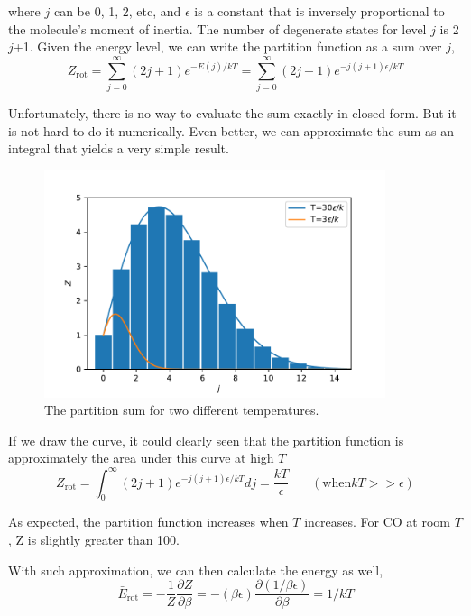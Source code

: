 where $j$ can be 0, 1, 2, etc, and $\epsilon$ is a constant that is inversely proportional to the molecule's moment of inertia.
The number of degenerate states for level $j$ is 2$j$+1. Given the energy level, we can write the partition function as a sum over $j$,
\begin{equation}
Z_\text{rot} = \sum_{j=0}^{\infty} (2j+1)e^{-E(j)/kT} = \sum_{j=0}^{\infty}(2j+1) e^{-j(j+1) \epsilon /kT}
\end{equation}
 
Unfortunately, there is no way to evaluate the sum exactly in closed form. But it is not hard to do it numerically. Even better,
we can approximate the sum as an integral that yields a very simple result.

\begin{figure}[h]
\centering
\includegraphics[width=10cm]{imgs/Rotation}
\caption{The partition sum for two different temperatures. }
\end{figure}

If we draw the curve, it could clearly seen that the partition function is approximately the area under this curve at high $T$
\begin{equation}
Z_\text{rot} = \int_{0}^{\infty}(2j+1) e^{-j(j+1) \epsilon /kT} dj = \frac{kT}{\epsilon}  ~~~~~~~~(\text{when} kT >> \epsilon)
\end{equation}
 
As expected, the partition function increases when $T$ increases. For CO at room $T$, Z is slightly greater than 100.

With such approximation, we can then calculate the energy as well,
\begin{equation}
\bar{E}_\text{rot} = -\frac{1}{Z} \frac{\partial Z}{\partial {\beta}} 
                   = -(\beta\epsilon) \frac{\partial(1/\beta\epsilon)}{\partial{\beta}}=1/kT
\end{equation}
 
